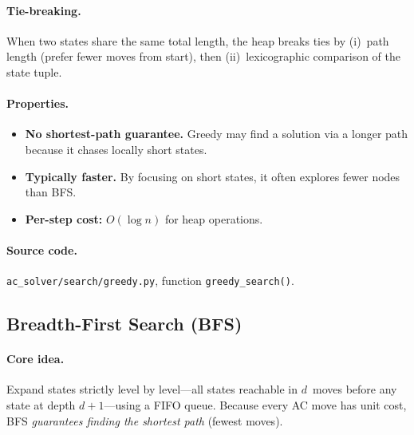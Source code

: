\documentclass[11pt,a4paper]{article}
\begin{document}
\paragraph{Tie-breaking.}
When two states share the same total length, the heap breaks ties by
(i)~path length (prefer fewer moves from start), then (ii)~lexicographic
comparison of the state tuple.

\paragraph{Properties.}
\begin{itemize}[nosep]
  \item \textbf{No shortest-path guarantee.}  Greedy may find a solution via a
    longer path because it chases locally short states.
  \item \textbf{Typically faster.}  By focusing on short states, it often
    explores fewer nodes than BFS.
  \item \textbf{Per-step cost:} $O(\log n)$ for heap operations.
\end{itemize}

\paragraph{Source code.}
\texttt{ac\_solver/search/greedy.py}, function \texttt{greedy\_search()}.

\subsection{Breadth-First Search (BFS)}\label{sec:bfs}

\paragraph{Core idea.}
Expand states strictly level by level---all states reachable in $d$~moves
before any state at depth $d+1$---using a FIFO queue.  Because every AC move
has unit cost, BFS \emph{guarantees finding the shortest path} (fewest moves).
\end{document}
